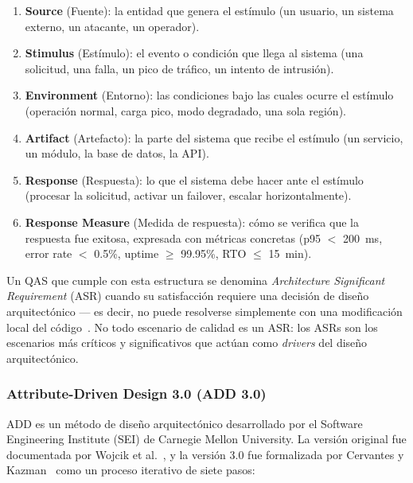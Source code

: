 \documentclass[12pt, letterpaper, oneside]{article}
\begin{document}
\begin{enumerate}
\item \textbf{Source} (Fuente): la entidad que genera el estímulo (un usuario,
un sistema externo, un atacante, un operador).
\item \textbf{Stimulus} (Estímulo): el evento o condición que llega al sistema
(una solicitud, una falla, un pico de tráfico, un intento de intrusión).
\item \textbf{Environment} (Entorno): las condiciones bajo las cuales ocurre el
estímulo (operación normal, carga pico, modo degradado, una sola región).
\item \textbf{Artifact} (Artefacto): la parte del sistema que recibe el estímulo
(un servicio, un módulo, la base de datos, la API).
\item \textbf{Response} (Respuesta): lo que el sistema debe hacer ante el estímulo
(procesar la solicitud, activar un failover, escalar horizontalmente).
\item \textbf{Response Measure} (Medida de respuesta): cómo se verifica que la
respuesta fue exitosa, expresada con métricas concretas (p95 $<$ 200~ms, error
rate $<$ 0.5\%, uptime $\geq$ 99.95\%, RTO $\leq$ 15~min).
\end{enumerate}

Un QAS que cumple con esta estructura se denomina \emph{Architecture Significant
Requirement} (ASR) cuando su satisfacción requiere una decisión de diseño
arquitectónico --- es decir, no puede resolverse simplemente con una modificación
local del código~\cite{cervantes2016designing}. No todo escenario de calidad es un
ASR: los ASRs son los escenarios más críticos y significativos que actúan como
\emph{drivers} del diseño arquitectónico.

\subsubsection{Attribute-Driven Design 3.0 (ADD 3.0)}

ADD es un método de diseño arquitectónico desarrollado por el Software Engineering
Institute (SEI) de Carnegie Mellon University. La versión original fue documentada
por Wojcik et al.~\cite{wojcik2006add}, y la versión 3.0 fue formalizada por
Cervantes y Kazman~\cite{cervantes2016designing} como un proceso iterativo de
siete pasos:
\end{document}
